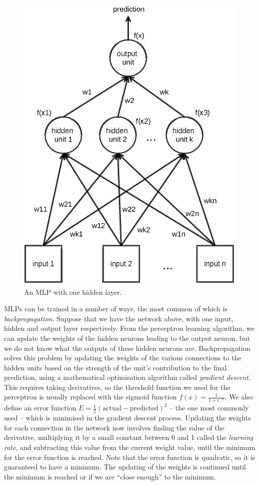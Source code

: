 \begin{figure}[h]
\centering
\includegraphics{images/method/mlp.eps}
\caption{An MLP with one hidden layer.}
\label{fig:mlp}

\end{figure}

MLPs can be trained in a number of ways, the most common of which is
\textit{backpropagation}. Suppose that we have the network above, with one
input, hidden and output layer respectively. From the perceptron learning
algorithm, we can update the weights of the hidden neurons leading to the
output neuron, but we do not know what the outputs of these hidden neurons are.
Backpropagation solves this problem by updating the weights of the various
connections to the hidden units based on the strength of the unit's
contribution to the final prediction, using a mathematical optimisation
algorithm called \textit{gradient descent}. This requires taking derivatives,
so the threshold function we used for the perceptron is usually replaced with
the sigmoid function $f(x) = \frac{1}{1+e^{-x}}$. We also define an error
function $E=\frac{1}{2}(\text{actual} - \text{predicted})^2$ -- the one most
commonly used -- which is
minimised in the gradient descent process. Updating the weights for each
connection in the network now involves finding the value of the derivative,
multiplying it by a small constant between 0 and 1 called the
\textit{learning rate}, and subtracting this value from the current weight
value, until the minimum for the error function is reached. Note that the
error function is quadratic, so it is guaranteed to have a minimum. The
updating of the weights is continued until the minimum is reached or if we
are ``close enough'' to the minimum.

